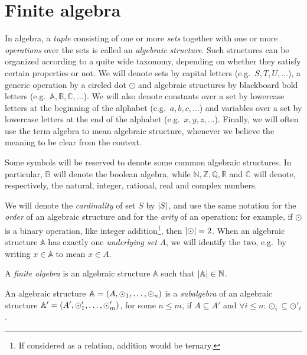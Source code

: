 \section{Finite algebra}\label{sec:prime_fields}
In algebra, a \emph{tuple} consisting of one or more \emph{sets} together with one or more 
\emph{operations} over the sets is called an \emph{algebraic structure}.
Such structures can be organized according to a quite wide taxonomy, depending on whether 
they satisfy certain properties or not. 
We will denote sets by capital letters (e.g.\  \(S, T, U, \dots \)), a generic operation by a 
circled dot \(\odot \) and algebraic structures by blackboard bold letters 
(e.g.\  \(\mathbb{A}, \mathbb{B}, \mathbb{C}, \dots \)).
We will also denote constants over a set by lowercase letters at the beginning of the alphabet 
(e.g.\  \(a, b, c, \dots \)) and variables over a set by lowercase letters at the end of the 
alphabet (e.g.\  \(x, y, z, \dots \)).
Finally, we will often use the term algebra to mean algebraic structure, whenever we believe the 
meaning to be clear from the context.
\begin{remark}
  Some symbols will be reserved to denote some common algebraic structures. 
  In particular, \(\mathbb{B}\) will denote the boolean algebra, while \(\mathbb{N}, \mathbb{Z}, 
  \mathbb{Q}, \mathbb{R}\) and \(\mathbb{C}\) will denote, respectively, the 
  natural, integer, rational, real and complex numbers.
\end{remark}

We will denote the \emph{cardinality} of set \(S\) by \(\left\lvert S\right\rvert\), and use the same notation for 
the \emph{order} of an algebraic structure and for the \emph{arity} of an operation: for example, 
if \(\odot \) is a binary operation, like integer 
addition\footnote{If considered as a relation, addition would be ternary.}, then \(\left\lvert\odot\right\rvert = 2\).
When an algebraic structure \(\mathbb{A}\) has exactly one \emph{underlying set} \(A\), we will 
identify the two, e.g.\ by writing \(x \in \mathbb{A}\) to mean \(x \in A\).

\begin{definition}
  A \emph{finite algebra} is an algebraic structure \(\mathbb{A}\) such that 
  \(\left\lvert\mathbb{A}\right\rvert \in \mathbb{N}\).
\end{definition}
\begin{definition}[Subalgebra]
  An algebraic structure \(\mathbb{A} = \left(A, \odot_1, \dots, \odot_n\right)\) is a \emph{subalgebra} 
  of an algebraic structure \(\mathbb{A}' = \left(A', \odot'_1, \dots, \odot'_m\right)\), 
  for some \(n \le m\), if \(A \subseteq A'\) and 
  \(\forall i \le n\colon \odot_i \subseteq \odot'_i\).
\end{definition}

